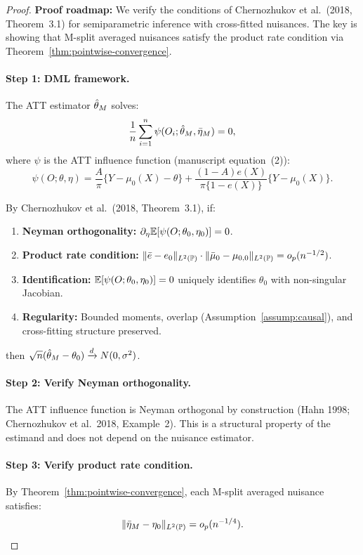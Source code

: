 \documentclass[12pt]{article}
\newcommand{\convd}{\xrightarrow{d}}
\begin{document}
\begin{proof}
\textbf{Proof roadmap:} We verify the conditions of Chernozhukov et al.\ (2018, Theorem~3.1) for semiparametric inference with cross-fitted nuisances. The key is showing that M-split averaged nuisances satisfy the product rate condition via Theorem~\ref{thm:pointwise-convergence}.

\paragraph{Step 1: DML framework.}
The ATT estimator $\hat{\theta}_M$ solves:
\[
\frac{1}{n} \sum_{i=1}^n \psi(O_i; \hat{\theta}_M, \bar{\eta}_M) = 0,
\]
where $\psi$ is the ATT influence function (manuscript equation~(2)):
\[
\psi(O; \theta, \eta) = \frac{A}{\pi}\bigl\{Y - \mu_0(X) - \theta\bigr\} + \frac{(1-A)e(X)}{\pi\{1 - e(X)\}}\bigl\{Y - \mu_0(X)\bigr\}.
\]

By Chernozhukov et al.\ (2018, Theorem~3.1), if:
\begin{enumerate}[label=(\roman*)]
\item \textbf{Neyman orthogonality:} $\partial_\eta \mathbb{E}[\psi(O; \theta_0, \eta_0)] = 0$.
\item \textbf{Product rate condition:} $\|\bar{e} - e_0\|_{L^2(\mathbb{P})} \cdot \|\bar{\mu}_0 - \mu_{0,0}\|_{L^2(\mathbb{P})} = o_p(n^{-1/2})$.
\item \textbf{Identification:} $\mathbb{E}[\psi(O; \theta_0, \eta_0)] = 0$ uniquely identifies $\theta_0$ with non-singular Jacobian.
\item \textbf{Regularity:} Bounded moments, overlap (Assumption~\ref{assump:causal}), and cross-fitting structure preserved.
\end{enumerate}
then $\sqrt{n}(\thetahat_M - \theta_0) \convd N(0, \sigma^2)$.

\paragraph{Step 2: Verify Neyman orthogonality.}
The ATT influence function is Neyman orthogonal by construction (Hahn 1998; Chernozhukov et al.\ 2018, Example~2). This is a structural property of the estimand and does not depend on the nuisance estimator. \checkmark

\paragraph{Step 3: Verify product rate condition.}
By Theorem~\ref{thm:pointwise-convergence}, each M-split averaged nuisance satisfies:
\[
\|\bar{\eta}_M - \eta_0\|_{L^2(\mathbb{P})} = o_p(n^{-1/4}).
\]


\end{proof}
\end{document}
